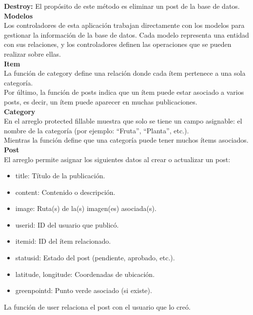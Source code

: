 \documentclass[11pt, a4paper, oneside]{book}
\begin{document}
\textbf {Destroy:} El propósito de este método es eliminar un post de la base de datos.\\

\textbf {Modelos}\\
Los controladores de esta aplicación trabajan directamente con los modelos para gestionar la información de la base de datos. Cada modelo representa una entidad con sus relaciones, y los controladores definen las operaciones que se pueden realizar sobre ellas.\\

\textbf {Item}\\
La función de category define una relación donde cada ítem pertenece a una sola categoría.\\

Por último, la función de posts indica que un ítem puede estar asociado a varios posts, es decir, un ítem puede aparecer en muchas publicaciones.\\

\textbf {Category}\\
En el arreglo protected fillable muestra que solo se tiene un campo asignable: el nombre de la categoría (por ejemplo: “Fruta”, “Planta”, etc.).\\

Mientras la función define que una categoría puede tener muchos ítems asociados.\\

\textbf {Post}\\
El arreglo permite asignar los siguientes datos al crear o actualizar un post:

\begin{itemize}
\item title: Título de la publicación.
\item content: Contenido o descripción.
\item image: Ruta(s) de la(s) imagen(es) asociada(s).
\item userid: ID del usuario que publicó.
\item itemid: ID del ítem relacionado.
\item statusid: Estado del post (pendiente, aprobado, etc.).
\item latitude, longitude: Coordenadas de ubicación.
\item greenpointd: Punto verde asociado (si existe).
\end{itemize}

La función de user relaciona el post con el usuario que lo creó.\\
\end{document}
